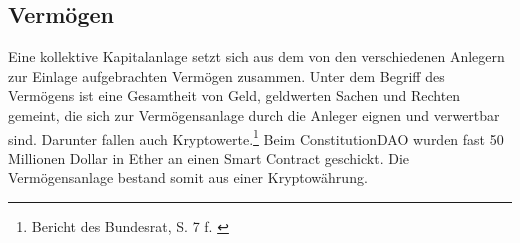 \documentclass[a4paper,12pt]{report}
\begin{document}
	\subsection{Vermögen}
	\startsubsection
	Eine kollektive Kapitalanlage setzt sich aus dem von den verschiedenen Anlegern zur Einlage aufgebrachten Vermögen zusammen. Unter dem Begriff des Vermögens ist eine Gesamtheit von Geld, geldwerten Sachen und Rechten gemeint, die sich zur Vermögensanlage durch die Anleger eignen und verwertbar sind.
	 Darunter fallen auch Kryptowerte.\footnote{\hspace{0.5em}Bericht des Bundesrat, S. 7 f. \citeauthor{BBR}} Beim ConstitutionDAO wurden fast 50 Millionen Dollar in Ether an einen Smart Contract geschickt. Die Vermögensanlage bestand somit aus einer Kryptowährung.
	\closesection
\end{document}
